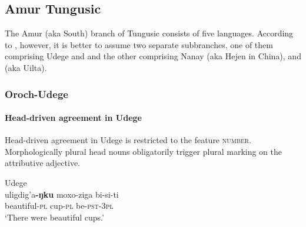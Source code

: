 \subsection{Amur Tungusic}
The Amur (aka South) branch of Tungusic consists of five languages. According to \citet[223]{salminen2007}, however, it is better to assume two separate subbranches, one of them comprising Udege and  and the other comprising Nanay (aka Hejen in China),  and  (aka Uilta).

\subsubsection{Oroch-Udege}
\paragraph*{Head\hyp{}driven agreement in Udege}
Head\hyp{}driven agreement in Udege is restricted to the feature \textsc{number}. Morphologically plural head nouns obligatorily trigger plural marking on the attributive adjective.
\begin{exe}
\ex 
{\rm Udege \citep[468]{nikolaeva-etal2001}}\\
\gll	uligdig'a\textbf{-ŋku} moxo-ziga bi-si-ti\\
	beautiful\textsc{-pl} cup\textsc{-pl} be\textsc{-pst-3pl}\\
\glt	‘There were beautiful cups.’
\end{exe}

